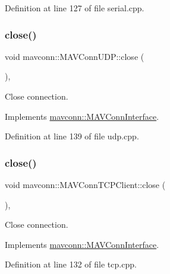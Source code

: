 Definition at line 127 of file serial.\+cpp.

\mbox{\label{group__mavconn_ga78a057400db4bf2240b00e29d4251dfe}} 
\subsubsection{\texorpdfstring{close()}{close()}\hspace{0.1cm}{\footnotesize\ttfamily [2/5]}}
{\footnotesize\ttfamily void mavconn\+::\+M\+A\+V\+Conn\+U\+D\+P\+::close (\begin{DoxyParamCaption}{ }\end{DoxyParamCaption})\hspace{0.3cm}{\ttfamily [override]}, {\ttfamily [virtual]}}



Close connection. 



Implements \mbox{\hyperlink{group__mavconn_ga7c1a5a89489e345a6621c327107293d8}{mavconn\+::\+M\+A\+V\+Conn\+Interface}}.



Definition at line 139 of file udp.\+cpp.

\mbox{\label{group__mavconn_ga3128ab3303f5a303be12c2c9df1ee321}} 
\subsubsection{\texorpdfstring{close()}{close()}\hspace{0.1cm}{\footnotesize\ttfamily [3/5]}}
{\footnotesize\ttfamily void mavconn\+::\+M\+A\+V\+Conn\+T\+C\+P\+Client\+::close (\begin{DoxyParamCaption}{ }\end{DoxyParamCaption})\hspace{0.3cm}{\ttfamily [override]}, {\ttfamily [virtual]}}



Close connection. 



Implements \mbox{\hyperlink{group__mavconn_ga7c1a5a89489e345a6621c327107293d8}{mavconn\+::\+M\+A\+V\+Conn\+Interface}}.



Definition at line 132 of file tcp.\+cpp.

